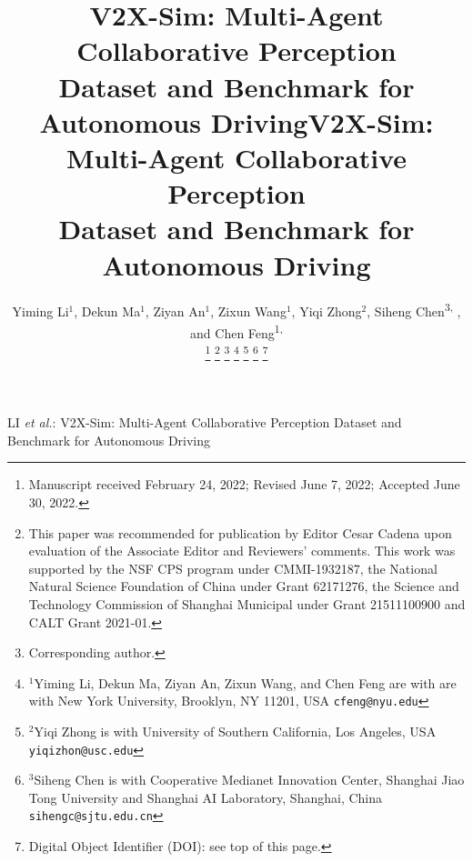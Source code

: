 \title{V2X-Sim: Multi-Agent Collaborative Perception \\Dataset and Benchmark for Autonomous Driving}



\author{Yiming Li$^{1}$, Dekun Ma$^{1}$, Ziyan An$^{1}$, Zixun Wang$^{1}$, Yiqi Zhong$^{2}$,  Siheng Chen\textsuperscript{3, }, and Chen Feng\textsuperscript{1, }%
\\
\thanks{Manuscript received February 24, 2022; Revised June 7, 2022; Accepted June 30, 2022.}%
\thanks{This paper was recommended for publication by Editor Cesar Cadena upon evaluation of the Associate Editor and Reviewers' comments. This work was supported by the NSF CPS program under CMMI-1932187, the National Natural Science Foundation of China under Grant 62171276, the Science and Technology Commission of Shanghai Municipal under Grant 21511100900 and CALT Grant 2021-01.}
\thanks{ Corresponding author.}%
\thanks{$^{1}$Yiming Li, Dekun Ma, Ziyan An, Zixun Wang, and Chen Feng are with are with New York University,
Brooklyn, NY 11201, USA  {\tt\small cfeng@nyu.edu}}%
\thanks{$^{2}$Yiqi Zhong is with University of Southern California, Los Angeles, USA {\tt\small yiqizhon@usc.edu}}%
\thanks{$^{3}$Siheng Chen is with Cooperative Medianet Innovation Center, Shanghai Jiao Tong University and Shanghai AI Laboratory, Shanghai, China {\tt\small sihengc@sjtu.edu.cn}}%
\thanks{Digital Object Identifier (DOI): see top of this page.}
}

\title{V2X-Sim: Multi-Agent Collaborative Perception \\Dataset and Benchmark for Autonomous Driving
}

{LI \MakeLowercase{\textit{et al.}}: V2X-Sim: Multi-Agent Collaborative Perception Dataset and Benchmark for Autonomous Driving} 

\maketitle

